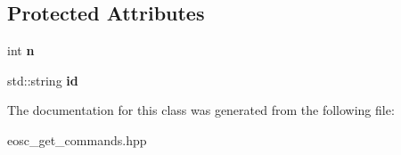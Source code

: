 \subsection*{Protected Attributes}
\begin{DoxyCompactItemize}
\item 
\mbox{\label{classtokenika_1_1eosc_1_1_get_block_options_af6c20effd6a52b8d26a8377450585142}} 
int {\bfseries n}
\item 
\mbox{\label{classtokenika_1_1eosc_1_1_get_block_options_a0eda5e812218067adfc5bbab2d6b4048}} 
std\+::string {\bfseries id}
\end{DoxyCompactItemize}


The documentation for this class was generated from the following file\+:\begin{DoxyCompactItemize}
\item 
eosc\+\_\+get\+\_\+commands.\+hpp\end{DoxyCompactItemize}
